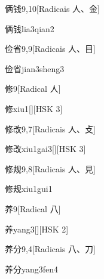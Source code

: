 \begin{entry}{俩钱}{9,10}[Radicais ⼈、⾦]
  \begin{phonetics}{俩钱}{lia3qian2}
  \end{phonetics}
\end{entry}

\begin{entry}{俭省}{9,9}[Radicais ⼈、⽬]
  \begin{phonetics}{俭省}{jian3sheng3}
  \end{phonetics}
\end{entry}

\begin{entry}{修}{9}[Radical ⼈]
  \begin{phonetics}{修}{xiu1}[][HSK 3]
  \end{phonetics}
\end{entry}

\begin{entry}{修改}{9,7}[Radicais ⼈、⽁]
  \begin{phonetics}{修改}{xiu1gai3}[][HSK 3]
  \end{phonetics}
\end{entry}

\begin{entry}{修规}{9,8}[Radicais ⼈、⾒]
  \begin{phonetics}{修规}{xiu1gui1}
  \end{phonetics}
\end{entry}

\begin{entry}{养}{9}[Radical ⼋]
  \begin{phonetics}{养}{yang3}[][HSK 2]
  \end{phonetics}
\end{entry}

\begin{entry}{养分}{9,4}[Radicais ⼋、⼑]
  \begin{phonetics}{养分}{yang3fen4}
  \end{phonetics}
\end{entry}

